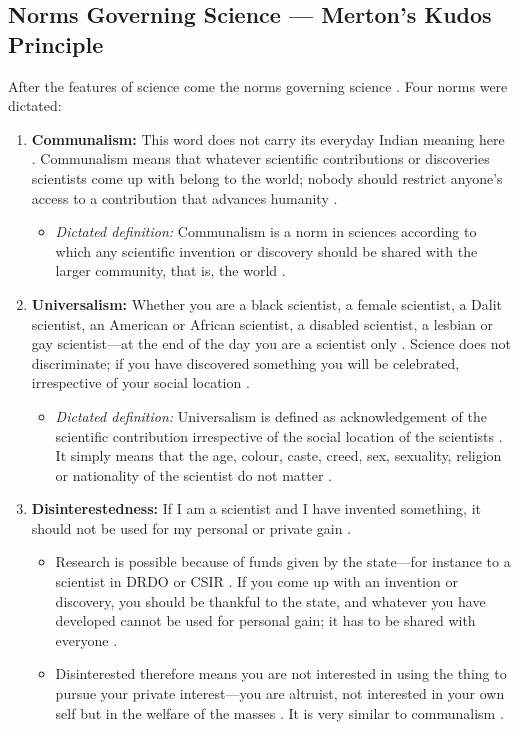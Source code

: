 \subsection{Norms Governing Science --- Merton's Kudos Principle}
After the features of science come the norms governing science . Four norms were dictated:
\begin{enumerate}
    \item \textbf{Communalism:} This word does not carry its everyday Indian meaning here . Communalism means that whatever scientific contributions or discoveries scientists come up with belong to the world; nobody should restrict anyone's access to a contribution that advances humanity .
    \begin{itemize}
        \item \textit{Dictated definition:} Communalism is a norm in sciences according to which any scientific invention or discovery should be shared with the larger community, that is, the world .
    \end{itemize}
    \item \textbf{Universalism:} Whether you are a black scientist, a female scientist, a Dalit scientist, an American or African scientist, a disabled scientist, a lesbian or gay scientist---at the end of the day you are a scientist only . Science does not discriminate; if you have discovered something you will be celebrated, irrespective of your social location .
    \begin{itemize}
        \item \textit{Dictated definition:} Universalism is defined as acknowledgement of the scientific contribution irrespective of the social location of the scientists . It simply means that the age, colour, caste, creed, sex, sexuality, religion or nationality of the scientist do not matter .
    \end{itemize}
    \item \textbf{Disinterestedness:} If I am a scientist and I have invented something, it should not be used for my personal or private gain .
    \begin{itemize}
        \item Research is possible because of funds given by the state---for instance to a scientist in DRDO or CSIR . If you come up with an invention or discovery, you should be thankful to the state, and whatever you have developed cannot be used for personal gain; it has to be shared with everyone .
        \item Disinterested therefore means you are not interested in using the thing to pursue your private interest---you are altruist, not interested in your own self but in the welfare of the masses . It is very similar to communalism .

\end{itemize}
\end{enumerate}
